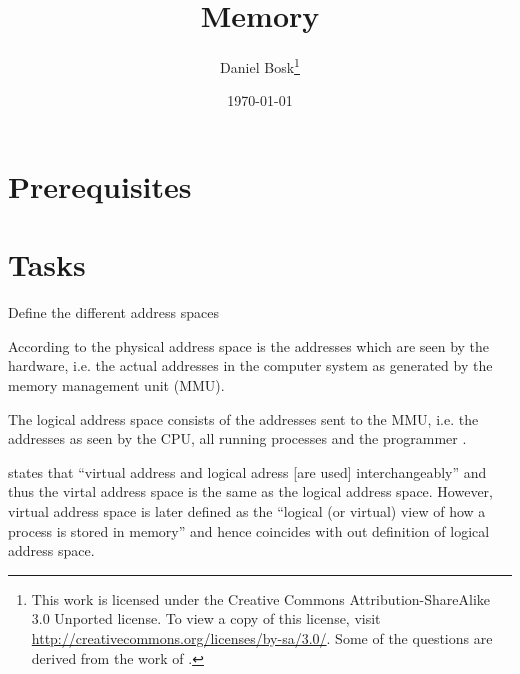 \documentclass[a4paper]{miunasgn}
\title{Memory}
\author{Daniel Bosk\footnote{%
	This work is licensed under the Creative Commons Attribution-ShareAlike 3.0 
	Unported license.
	To view a copy of this license, visit 
	\url{http://creativecommons.org/licenses/by-sa/3.0/}.
	Some of the questions are derived from the work of 
	\citeauthor*{Silberschatz2009osc}.
}}
\date{\today}
\theoremstyle{definition}
\begin{document}
\maketitle
\thispagestyle{foot}
\tableofcontents


\section{Prerequisites}
\label{sec:Prerequisites}



\section{Tasks}
\label{sec:Tasks}
\begin{questions}


	\question\label{q:addressspaces}
	Define the different address spaces
	\begin{solution}
		According to \citet[p. 319]{Silberschatz2009osc} the physical address space 
		is the addresses which are seen by the hardware, i.e. the actual addresses 
		in the computer system as generated by the memory management unit (MMU).

		The logical address space consists of the addresses sent to the MMU, i.e.  
		the addresses as seen by the CPU, all running processes and the programmer 
		\citep[ch. 8]{Silberschatz2009osc}.

		\citet{Silberschatz2009osc} states that ``virtual address and logical 
		adress [are used] interchangeably'' \citep[p. 319]{Silberschatz2009osc} and 
		thus the virtal address space is the same as the logical address space.
		However, virtual address space is later defined as the ``logical (or 
		virtual) view of how a process is stored in memory'' \citep[p.  
		359]{Silberschatz2009osc} and hence coincides with out definition of 
		logical address space.
	\end{solution}


\end{questions}
\end{document}

